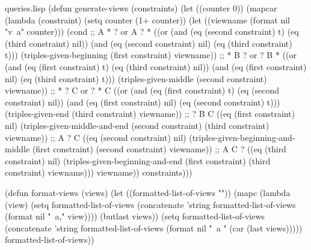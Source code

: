 \begin{common}{queries.lisp}
(defun generate-views (constraints)
  (let ((counter 0))
    (mapcar
     (lambda (constraint)
       (setq counter (1+ counter))
       (let ((viewname (format nil "v~a" counter)))
         (cond
          ;; A * ? or A ? *
          ((or (and (eq (second constraint) t)
                    (eq (third constraint) nil))
               (and (eq (second constraint) nil)
                    (eq (third constraint) t)))
           (triples-given-beginning
            (first constraint)
            viewname))
          ;; * B ? or ? B *
          ((or (and (eq (first constraint) t)
                    (eq (third constraint) nil))
               (and (eq (first constraint) nil)
                    (eq (third constraint) t)))
           (triples-given-middle
            (second constraint)
            viewname))
          ;; * ? C or ? * C
          ((or (and (eq (first constraint) t)
                    (eq (second constraint) nil))
               (and (eq (first constraint) nil)
                    (eq (second constraint) t)))
           (triples-given-end
            (third constraint)
            viewname))
          ;; ? B C
          ((eq (first constraint) nil)
           (triples-given-middle-and-end
            (second constraint)
            (third constraint)
            viewname))
          ;; A ? C
          ((eq (second constraint) nil)
           (triples-given-beginning-and-middle
            (first constraint)
            (second constraint)
            viewname))
          ;; A C ?
          ((eq (third constraint) nil)
           (triples-given-beginning-and-end
            (first constraint)
            (third constraint)
            viewname)))
         viewname))
     constraints)))

(defun format-views (views)
  (let ((formatted-list-of-views ""))
    (mapc (lambda (view)
            (setq formatted-list-of-views
                  (concatenate
                   'string
                   formatted-list-of-views
                   (format nil "~a," view))))
          (butlast views))
    (setq formatted-list-of-views
          (concatenate
           'string
           formatted-list-of-views
           (format nil "~a " (car (last views)))))
    formatted-list-of-views))


\end{common}

